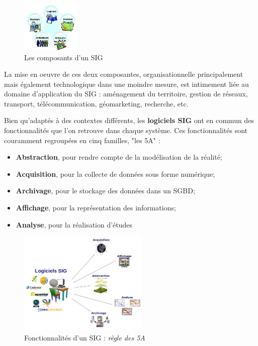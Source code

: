 \documentclass[11pt]{article}
\begin{document}
\begin{figure}[!h]
	\center \includegraphics[width=0.25\textwidth]{img/cours/composants_sig.png}
	\caption{Les composants d'un SIG}
\end{figure}

La mise en oeuvre de ces deux composantes, organisationnelle principalement mais également technologique dans une moindre mesure, est intimement liée au domaine d'application du SIG : aménagement du territoire, gestion de réseaux, transport, télécommunication, géomarketing, recherche, etc.

Bien qu'adaptés à des contextes différents, les \textbf{logiciels SIG} ont en commun des fonctionnalités que l'on retrouve dans chaque système. Ces fonctionnalités sont couramment regroupées en cinq familles, "les 5A" :
\begin{itemize}
	\item \textbf{Abstraction}, pour rendre compte de la modélisation de la réalité;
	\item \textbf{Acquisition}, pour la collecte de données sous forme numérique;
	\item \textbf{Archivage}, pour le stockage des données dans un SGBD;
	\item \textbf{Affichage}, pour la représentation des informations;
	\item \textbf{Analyse}, pour la réalisation d'études
\end{itemize}

\begin{figure}[!h]
	\center \includegraphics[width=0.55\textwidth]{img/cours/fonctionnalites_sig.png}
	\caption{Fonctionnalités d'un SIG : \textit{règle des 5A}}
\end{figure}
\end{document}
